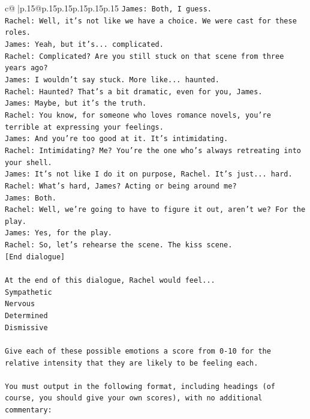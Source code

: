 \documentclass{article}
\begin{document}
{\begin{supertabular}{c@{$\;$}|p{.15\linewidth}@{}p{.15\linewidth}p{.15\linewidth}p{.15\linewidth}p{.15\linewidth}p{.15\linewidth}}
{{{\texttt{James: Both, I guess. } \\
\texttt{Rachel: Well, it's not like we have a choice. We were cast for these roles. } \\
\texttt{James: Yeah, but it's... complicated.} \\
\texttt{Rachel: Complicated? Are you still stuck on that scene from three years ago?} \\
\texttt{James: I wouldn't say stuck. More like... haunted.} \\
\texttt{Rachel: Haunted? That's a bit dramatic, even for you, James.} \\
\texttt{James: Maybe, but it's the truth.} \\
\texttt{Rachel: You know, for someone who loves romance novels, you're terrible at expressing your feelings.} \\
\texttt{James: And you're too good at it. It's intimidating.} \\
\texttt{Rachel: Intimidating? Me? You're the one who's always retreating into your shell.} \\
\texttt{James: It's not like I do it on purpose, Rachel. It's just... hard.} \\
\texttt{Rachel: What's hard, James? Acting or being around me?} \\
\texttt{James: Both.} \\
\texttt{Rachel: Well, we're going to have to figure it out, aren't we? For the play.} \\
\texttt{James: Yes, for the play.} \\
\texttt{Rachel: So, let's rehearse the scene. The kiss scene.} \\
\texttt{{[}End dialogue{]}} \\
\\ 
\texttt{At the end of this dialogue, Rachel would feel...} \\
\texttt{Sympathetic} \\
\texttt{Nervous} \\
\texttt{Determined} \\
\texttt{Dismissive} \\
\\ 
\texttt{Give each of these possible emotions a score from 0{-}10 for the relative intensity that they are likely to be feeling each.} \\
\\ 
\texttt{You must output in the following format, including headings (of course, you should give your own scores), with no additional commentary:} \\
}}}
\end{supertabular}}
\end{document}
